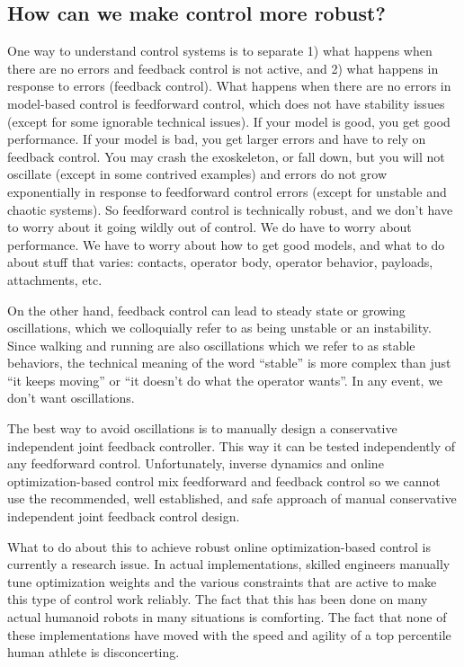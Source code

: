 \documentclass[letterpaper,12pt,fullpage]{article}
\begin{document}
\subsection{How can we make control more robust?}

One way to understand control systems is to separate 1) what happens when there
are no errors and feedback control is not active, and 2) what happens in response
to errors (feedback control). 
What happens when there are no errors in model-based control is 
feedforward control, which does not have stability issues (except for some ignorable
technical issues). If your model is good, you get good performance. If your
model is bad, you get larger errors and have to rely on feedback control.
You may crash the exoskeleton, or fall down, but you will not oscillate
(except in some contrived examples) and errors do not grow exponentially in
response to feedforward control errors (except for unstable and chaotic systems).
So feedforward control is technically robust,  
and we don't have to worry about it going wildly out of control.
We do have to worry about performance.
We have
to worry about how to get good models, and what to do about stuff that varies:
contacts, operator body, operator behavior, payloads, attachments, etc.

On the other hand, feedback control can lead to steady state or growing
oscillations, which we colloquially refer to as being unstable or an
instability.
Since walking and running are also oscillations which we refer to as stable
behaviors, the technical meaning of the word ``stable'' is more complex than
just ``it keeps moving'' or ``it doesn't do what the operator wants''.
In any event, we don't want oscillations.

The best way to avoid oscillations is to manually design a conservative 
independent joint feedback controller.
This way it can be tested independently of any
feedforward control.
Unfortunately, inverse dynamics and online optimization-based control mix
feedforward and feedback control so we cannot use the recommended, well established,
and safe approach of manual conservative independent joint feedback control design. 

What to do about this to achieve robust online optimization-based control is
currently a research issue. In actual implementations, skilled engineers manually
tune optimization weights and the various constraints that are active to
make this type of control work reliably. The fact that this has been done on many actual
humanoid robots in many situations is comforting. The fact that none of these
implementations have moved with the speed and agility of a top percentile
human athlete is disconcerting.
\end{document}
